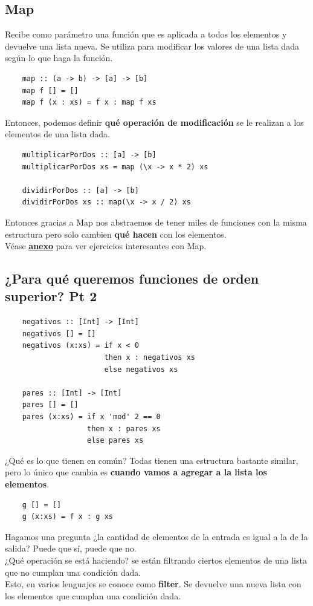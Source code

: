 \documentclass[10pt,a4paper]{article}
\begin{document}
\subsection*{Map}
Recibe como parámetro una función que es aplicada a todos los elementos y devuelve una lista nueva. Se utiliza para modificar los valores de una lista dada según lo que haga la función. \\
\begin{lstlisting}
    map :: (a -> b) -> [a] -> [b]
    map f [] = []
    map f (x : xs) = f x : map f xs 
\end{lstlisting}

Entonces, podemos definir \textbf{qué operación de modificación} se le realizan a los elementos de una lista dada.
\begin{lstlisting}
    multiplicarPorDos :: [a] -> [b]
    multiplicarPorDos xs = map (\x -> x * 2) xs 

    dividirPorDos :: [a] -> [b]
    dividirPorDos xs :: map(\x -> x / 2) xs 
\end{lstlisting}
Entonces gracias a Map nos abstraemos de tener miles de funciones con la misma estructura pero solo cambien \textbf{qué hacen} con los elementos. \\
Véase \hyperref[subsec:map_ejercicios]{\underline{\textbf{anexo}}} para ver ejercicios interesantes con Map. 
\subsection*{¿Para qué queremos funciones de orden superior? Pt 2}
\begin{lstlisting}
    negativos :: [Int] -> [Int]
    negativos [] = []
    negativos (x:xs) = if x < 0 
                       then x : negativos xs
                       else negativos xs 
    
    pares :: [Int] -> [Int]
    pares [] = []
    pares (x:xs) = if x 'mod' 2 == 0
                   then x : pares xs 
                   else pares xs
\end{lstlisting}
¿Qué es lo que tienen en común? Todas tienen una estructura bastante similar, pero lo único que cambia es \textbf{cuando vamos a agregar a la lista los elementos}. \\

\begin{lstlisting}
    g [] = []
    g (x:xs) = f x : g xs
\end{lstlisting}

Hagamos una pregunta ¿la cantidad de elementos de la entrada es igual a la de la salida? Puede que sí, puede que no.   \\
¿Qué operación se está haciendo? se están filtrando ciertos elementos de una lista que no cumplan una condición dada. \\
Esto, en varios lenguajes se conoce como \textbf{filter}. Se devuelve una nueva lista con los elementos que cumplan una condición dada.
\end{document}
